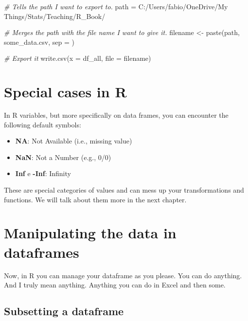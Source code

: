 \documentclass[
]{book}
\newenvironment{Shaded}{\begin{snugshade}}{\end{snugshade}}
\newcommand{\AttributeTok}[1]{\textcolor[rgb]{0.77,0.63,0.00}{#1}}
\newcommand{\CommentTok}[1]{\textcolor[rgb]{0.56,0.35,0.01}{\textit{#1}}}
\newcommand{\FunctionTok}[1]{\textcolor[rgb]{0.00,0.00,0.00}{#1}}
\newcommand{\NormalTok}[1]{#1}
\newcommand{\OtherTok}[1]{\textcolor[rgb]{0.56,0.35,0.01}{#1}}
\newcommand{\StringTok}[1]{\textcolor[rgb]{0.31,0.60,0.02}{#1}}
\begin{document}
\begin{Shaded}
\begin{Highlighting}[]
\CommentTok{\# Tells the path I want to export to.}
\NormalTok{path }\OtherTok{=} \StringTok{\textquotesingle{}C:/Users/fabio/OneDrive/My Things/Stats/Teaching/R\_Book/\textquotesingle{}}

\CommentTok{\# Merges the path with the file name I want to give it.}
\NormalTok{filename }\OtherTok{\textless{}{-}} \FunctionTok{paste}\NormalTok{(path, }\StringTok{\textquotesingle{}some\_data.csv\textquotesingle{}}\NormalTok{, }\AttributeTok{sep =} \StringTok{\textquotesingle{}\textquotesingle{}}\NormalTok{)}

\CommentTok{\# Export it}
\FunctionTok{write.csv}\NormalTok{(}\AttributeTok{x =}\NormalTok{ df\_all, }\AttributeTok{file =}\NormalTok{ filename)}
\end{Highlighting}
\end{Shaded}

\hypertarget{special-cases-in-r}{%
\section{Special cases in R}\label{special-cases-in-r}}

In R variables, but more specifically on data frames, you can encounter the following default symbols:

\begin{itemize}
\item
  \textbf{NA}: Not Available (i.e., missing value)
\item
  \textbf{NaN}: Not a Number (e.g., 0/0)
\item
  \textbf{Inf} e \textbf{-Inf}: Infinity
\end{itemize}

These are special categories of values and can mess up your transformations and functions.
We will talk about them more in the next chapter.

\hypertarget{manipulating-the-data-in-dataframes}{%
\section{Manipulating the data in dataframes}\label{manipulating-the-data-in-dataframes}}

Now, in R you can manage your dataframe as you please.
You can do anything.
And I truly mean anything.
Anything you can do in Excel and then some.

\hypertarget{subsetting-a-dataframe}{%
\subsection{Subsetting a dataframe}\label{subsetting-a-dataframe}}
\end{document}
